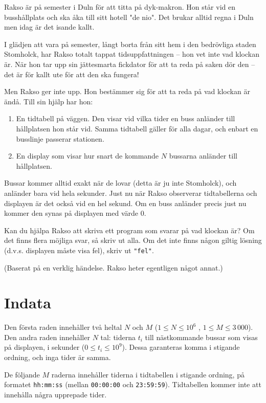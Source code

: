 Rakso är på semester i Duln för att titta på dyk-makron. Hon står vid en busshållplats och ska åka till sitt hotell "de nio". Det brukar alltid regna i Duln men idag är det isande kallt.

I glädjen att vara på semester, långt borta från sitt hem i den bedrövliga staden Stomholck, har Rakso totalt tappat tidsuppfattningen -- hon vet inte vad klockan är. När hon tar upp sin jättesmarta fickdator för att ta reda på saken dör den -- det är för kallt ute för att den ska fungera!

Men Rakso ger inte upp. Hon bestämmer sig för att ta reda på vad klockan är ändå. Till sin hjälp har hon:
\begin{enumerate}
  \item En tidtabell på väggen. Den visar vid vilka tider en buss anländer till hållplatsen hon står vid.
    Samma tidtabell gäller för alla dagar, och enbart en busslinje passerar stationen.
  \item En display som visar hur snart de kommande $N$ bussarna anländer till hållplatsen.
\end{enumerate}
Bussar kommer alltid exakt när de lovar (detta är ju inte Stomholck), och anländer bara vid hela sekunder. Just nu när Rakso observerar tidtabellerna och displayen är det också vid en hel sekund. Om en buss anländer precis just nu kommer den synas på displayen med värde $0$.

Kan du hjälpa Rakso att skriva ett program som svarar på vad klockan är? Om det finns flera möjliga svar, så skriv ut alla.
Om det inte finns någon giltig lösning (d.v.s. displayen måste visa fel), skriv ut \texttt{"fel"}.

(Baserat på en verklig händelse. Rakso heter egentligen något annat.)

\section*{Indata}
Den första raden innehåller två heltal $N$ och $M$ ($1 \leq N \leq 10^6$ , $1 \leq M \leq 3\,000$).
Den andra raden innehåller $N$ tal: tiderna $t_i$ till nästkommande bussar som visas på displayen, i sekunder ($0 \le t_i \le 10^9$).
Dessa garanteras komma i stigande ordning, och inga tider är samma.

De följande $M$ raderna innehåller tiderna i tidtabellen i stigande ordning, på formatet \texttt{hh:mm:ss} (mellan \texttt{00:00:00} och \texttt{23:59:59}).
Tidtabellen kommer inte att innehålla några upprepade tider.

